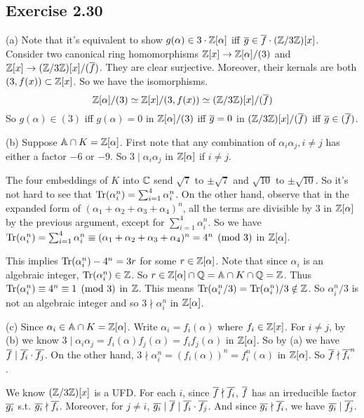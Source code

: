\documentclass[../Marcus.tex]{subfiles}
\begin{document}
\subsection*{Exercise 2.30}

(a) Note that it's equivalent to show $g(\alpha)\in3\cdot\mathbb{Z}[\alpha]$ iff $\overline{g}\in\overline{f}\cdot(\mathbb{Z}/3\mathbb{Z})[x]$. Consider two canonical ring homomorphisms $\mathbb{Z}[x]\to\mathbb{Z}[\alpha]/(3)$ and $\mathbb{Z}[x]\to(\mathbb{Z}/3\mathbb{Z})[x]/(\overline{f})$. They are clear surjective. Moreover, their kernals are both $(3,f(x))\subset\mathbb{Z}[x]$. So we have the isomorphisms. $$\mathbb{Z}[\alpha]/(3) \simeq \mathbb{Z}[x]/(3,f(x)) \simeq (\mathbb{Z}/3\mathbb{Z})[x]/(\overline{f})$$ So $g(\alpha)\in(3)$ iff $g(\alpha)=0$ in $\mathbb{Z}[\alpha]/(3)$ iff $\overline{g}=0$ in $(\mathbb{Z}/3\mathbb{Z})[x]/(\overline{f})$ iff $\overline{g}\in(\overline{f})$.

(b) Suppose $\mathbb{A}\cap K=\mathbb{Z}[\alpha]$. First note that any combination of $\alpha_i\alpha_j,i\neq j$ has either a factor $-6$ or $-9$. So $3\mid\alpha_i\alpha_j$ in $\mathbb{Z}[\alpha]$ if $i\neq j$.

The four embeddings of $K$ into $\mathbb{C}$ send $\sqrt{7}$ to $\pm\sqrt{7}$ and $\sqrt{10}$ to $\pm\sqrt{10}$. So it's not hard to see that $\operatorname{Tr}(\alpha_i^n)=\sum_{i=1}^4 \alpha_i^n$. On the other hand, observe that in the expanded form of $(\alpha_1+\alpha_2+\alpha_3+\alpha_4)^n$, all the terms are divisible by $3$ in $\mathbb{Z}[\alpha]$ by the previous argument, except for $\sum_{i=1}^4 \alpha_i^n$. So we have $\operatorname{Tr}(\alpha_i^n)=\sum_{i=1}^4 \alpha_i^n \equiv (\alpha_1+\alpha_2+\alpha_3+\alpha_4)^n =4^n \pmod{3}$ in $\mathbb{Z}[\alpha]$.

This implies $\operatorname{Tr}(\alpha_i^n)-4^n=3r$ for some $r\in\mathbb{Z}[\alpha]$. Note that since $\alpha_i$ is an algebraic integer, $\operatorname{Tr}(\alpha_i^n)\in\mathbb{Z}$. So $r\in\mathbb{Z}[\alpha]\cap\mathbb{Q}=\mathbb{A}\cap K\cap\mathbb{Q}=\mathbb{Z}$. Thus $\operatorname{Tr}(\alpha_i^n)\equiv4^n \equiv 1\pmod{3}$ in $\mathbb{Z}$. This means $\operatorname{Tr}(\alpha_i^n/3)=\operatorname{Tr}(\alpha_i^n)/3\notin\mathbb{Z}$. So $\alpha_i^n/3$ is not an algebraic integer and so $3\nmid \alpha_i^n$ in $\mathbb{Z}[\alpha]$.

(c) Since $\alpha_i\in\mathbb{A}\cap K=\mathbb{Z}[\alpha]$. Write $\alpha_i=f_i(\alpha)$ where $f_i\in\mathbb{Z}[x]$. For $i\neq j$, by (b) we know $3\mid \alpha_i\alpha_j=f_i(\alpha)f_j(\alpha)=f_if_j(\alpha)$ in $\mathbb{Z}[\alpha]$. So by (a) we have $\overline{f}\mid\overline{f_i}\cdot\overline{f_j}$. On the other hand, $3\nmid \alpha_i^n=(f_i(\alpha))^n=f_i^n(\alpha)$ in $\mathbb{Z}[\alpha]$. So $\overline{f}\nmid\overline{f_i}^n$.

We know $(\mathbb{Z}/3\mathbb{Z})[x]$ is a UFD. For each $i$, since $\overline{f}\nmid\overline{f_i}$, $\overline{f}$ has an irreducible factor $\overline{g_i}$ s.t. $\overline{g_i}\nmid\overline{f_i}$. Moreover, for $j\neq i$, $\overline{g_i}\mid\overline{f}\mid\overline{f_i}\cdot\overline{f_j}$. And since $\overline{g_i}\nmid\overline{f_i}$, we have $\overline{g_i}\mid\overline{f_j}$.
\end{document}
